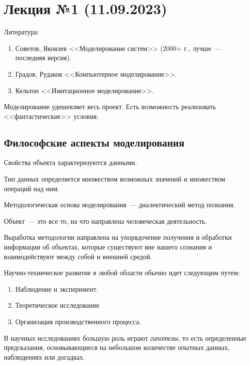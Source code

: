\section{Лекция №1 (11.09.2023)}

Литература:

\begin{enumerate}
    \item Советов, Яковлев <<Моделирование систем>> (2000+ г., лучше~--- последняя версия).
    \item Градов, Рудаков <<Компьютерное моделирование>>.
    \item Кельтон <<Имитационное моделирование>>.
\end{enumerate}

Моделирование удешевляет весь проект. Есть возможность реализовать <<фантастические>> условия.

\subsection{Философские аспекты моделирования}

Свойства объекта характеризуются данными.

Тип данных определяется множеством возможных значений и множеством операций над ним.

Методологическая основа моделирования~--- диалектический метод познания.

\begin{dd}
    Объект~--- это все то, на что направлена человеческая деятельность.
\end{dd}

Выработка методологии направлена на упорядочение получения и обработки информации об объектах, которые существуют вне нашего сознания и взаимодействуют между собой и внешней средой.

Научно-техническое развитие в любой области обычно идет следующим путем:

\begin{enumerate}
    \item Наблюдение и эксперимент.
    \item Теоретическое исследование.
    \item Организация производственного процесса.
\end{enumerate}

В научных исследованиях большую роль играют \textit{гипотезы}, то есть определенные предсказания, основывающиеся на небольшом количестве опытных данных, наблюдениях или догадках.

